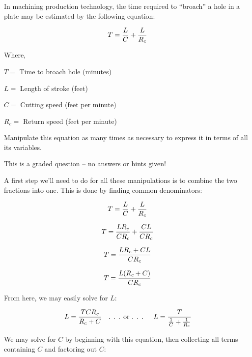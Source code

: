 

In machining production technology, the time required to ``broach'' a hole in a plate may be estimated by the following equation:

$$T = {L \over C} + {L \over R_c}$$

\noindent
Where,

$T =$ Time to broach hole (minutes)

$L =$ Length of stroke (feet)

$C =$ Cutting speed (feet per minute)

$R_c =$ Return speed (feet per minute)

\vskip 10pt

Manipulate this equation as many times as necessary to express it in terms of all its variables.

\vfil 

\eject






This is a graded question -- no answers or hints given!







A first step we'll need to do for all these manipulations is to combine the two fractions into one.  This is done by finding common denominators:

$$T = {L \over C} + {L \over R_c}$$

$$T = {L R_c \over C R_c} + {C L \over C R_c}$$

$$T = {{L R_c + C L} \over C R_c}$$

$$T = {{L (R_c + C)} \over C R_c}$$

From here, we may easily solve for $L$:

$$L = {{T C R_c} \over {R_c + C}} \hbox{\hskip 10pt . . . or . . . \hskip 10pt} L = {T \over {{1 \over C} + {1 \over R_c}}} $$

\vskip 20pt

We may solve for $C$ by beginning with this equation, then collecting all terms containing $C$ and factoring out $C$:

